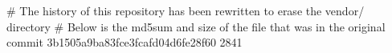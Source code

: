 # The history of this repository has been rewritten to erase the vendor/ directory
# Below is the md5sum and size of the file that was in the original commit
3b1505a9ba83fce3fcafd04d6fe28f60
2841
